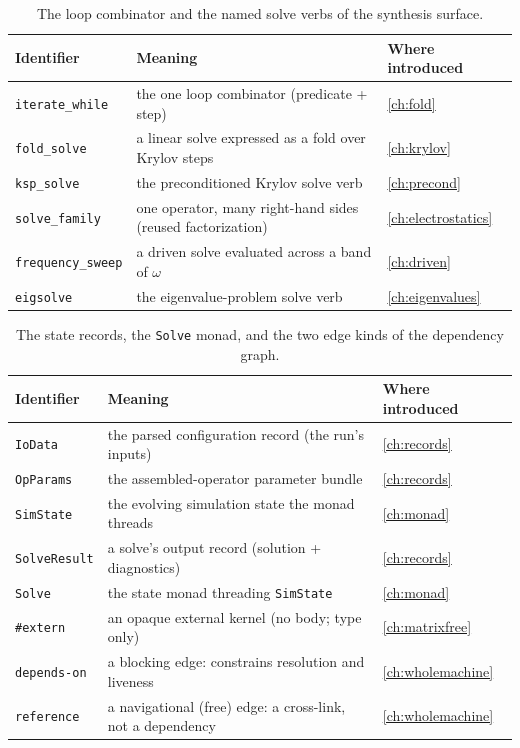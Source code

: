 \begin{table}[ht]
\centering
\small
\caption[Combinators and named operators]{The loop combinator and the named solve
verbs of the synthesis surface.}
\label{tab:gl-calc-ops}
\begin{tabular}{@{}lll@{}}
\toprule
Identifier & Meaning & Where introduced \\
\midrule
\texttt{iterate\_while} & the one loop combinator (predicate + step) & \cref{ch:fold} \\
\texttt{fold\_solve} & a linear solve expressed as a fold over Krylov steps & \cref{ch:krylov} \\
\texttt{ksp\_solve} & the preconditioned Krylov solve verb & \cref{ch:precond} \\
\texttt{solve\_family} & one operator, many right-hand sides (reused factorization) & \cref{ch:electrostatics} \\
\texttt{frequency\_sweep} & a driven solve evaluated across a band of $\omega$ & \cref{ch:driven} \\
\texttt{eigsolve} & the eigenvalue-problem solve verb & \cref{ch:eigenvalues} \\
\bottomrule
\end{tabular}
\end{table}

\begin{table}[ht]
\centering
\small
\caption[Records and effects]{The state records, the \texttt{Solve} monad, and
the two edge kinds of the dependency graph.}
\label{tab:gl-calc-records}
\begin{tabular}{@{}lll@{}}
\toprule
Identifier & Meaning & Where introduced \\
\midrule
\texttt{IoData} & the parsed configuration record (the run's inputs) & \cref{ch:records} \\
\texttt{OpParams} & the assembled-operator parameter bundle & \cref{ch:records} \\
\texttt{SimState} & the evolving simulation state the monad threads & \cref{ch:monad} \\
\texttt{SolveResult} & a solve's output record (solution + diagnostics) & \cref{ch:records} \\
\texttt{Solve} & the state monad threading \texttt{SimState} & \cref{ch:monad} \\
\texttt{\#extern} & an opaque external kernel (no body; type only) & \cref{ch:matrixfree} \\
\texttt{depends-on} & a blocking edge: constrains resolution and liveness & \cref{ch:wholemachine} \\
\texttt{reference} & a navigational (free) edge: a cross-link, not a dependency & \cref{ch:wholemachine} \\
\bottomrule
\end{tabular}
\end{table}

